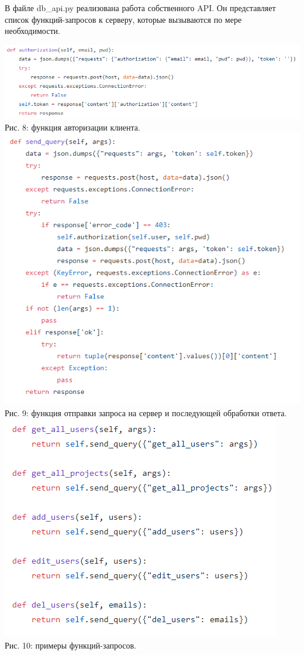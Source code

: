 \documentclass[14pt,a4paper,openbib]{extarticle}
\numberwithin{equation}{section}
\begin{document}
В файле db\_api.py реализована работа собственного API. Он представляет список функций-запросов к серверу, которые вызываются по мере необходимости.
\begin{center}
\includegraphics[scale=0.7]{img/authorization_client.png}\\
Рис. 8: функция авторизации клиента.\\[\baselineskip]
\includegraphics[scale=0.6]{img/send_query.png}\\
Рис. 9: функция отправки запроса на сервер и последующей обработки ответа.\\[\baselineskip]
\includegraphics[scale=0.7]{img/other_func.png}\\
Рис. 10: примеры функций-запросов.\\[\baselineskip]
\end{center}
\end{document}
